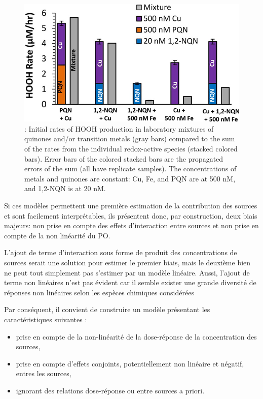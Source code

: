 \begin{figure}[ht]
    \centering
    \includegraphics[width=0.5\linewidth]{figures/chapter05/charrier_hydrogen_2014_fig4.jpg}
    \caption{\cite[figure 4]{charrierHydrogen2014}: Initial rates of HOOH production in
    laboratory mixtures of quinones and/or transition metals (gray bars) compared to the
    sum of the rates from the individual redox-active species (stacked colored bars). Error
    bars of the colored stacked bars are the propagated errors of the sum (all have replicate
    samples). The concentrations of metals and quinones are constant: Cu, Fe, and PQN are at
    500 nM, and 1,2-NQN is at 20 nM.}%
    \label{fig:charrier_hydrogen_2014_fig4}
\end{figure}

Si ces modèles permettent une première estimation de la contribution des sources et sont
facilement interprétables, ils présentent donc, par construction, deux biais majeurs: non
prise en compte des effets d'interaction entre sources et non prise en compte de la non
linéarité du PO.

L'ajout de terme d'interaction sous forme de produit des concentrations de sources serait
une solution pour estimer le premier biais, mais le deuxième bien ne peut tout simplement
pas s'estimer par un modèle linéaire. Aussi, l'ajout de terme non linéaires n'est pas
évident car il semble exister une grande diversité de réponses non linéaires selon les
espèces chimiques
considérées~\autocite{charrierDithiothreitol2012,charrierBias2016,calasImportance2017}

Par conséquent, il convient de construire un modèle présentant les caractéristiques
suivantes :
\begin{itemize}
    \item prise en compte de la non-linéarité de la dose-réponse de la concentration des
        sources,
    \item prise en compte d'effets conjoints, potentiellement non linéaire et négatif,
        entres les sources,
    \item ignorant des relations dose-réponse ou entre sources a priori.
\end{itemize}

